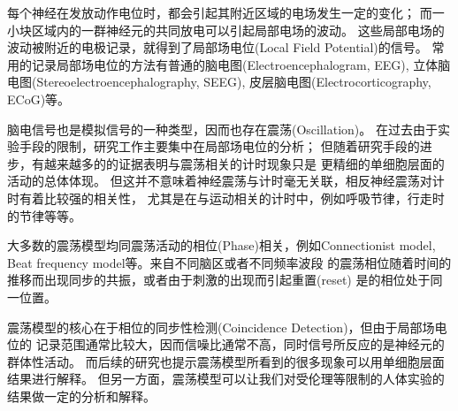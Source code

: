 每个神经在发放动作电位时，都会引起其附近区域的电场发生一定的变化；
而一小块区域内的一群神经元的共同放电可以引起局部电场的波动。
这些局部电场的波动被附近的电极记录，就得到了局部场电位(Local Field Potential)的信号。
常用的记录局部场电位的方法有普通的脑电图(Electroencephalogram, EEG),
立体脑电图(Stereoelectroencephalography, SEEG), 皮层脑电图(Electrocorticography, ECoG)等。

脑电信号也是模拟信号的一种类型，因而也存在震荡(Oscillation)。
在过去由于实验手段的限制，研究工作主要集中在局部场电位的分析；
但随着研究手段的进步，有越来越多的的证据表明与震荡相关的计时现象只是
更精细的单细胞层面的活动的总体体现。
但这并不意味着神经震荡与计时毫无关联，相反神经震荡对计时有着比较强的相关性，
尤其是在与运动相关的计时中，例如呼吸节律，行走时的节律等等。

大多数的震荡模型均同震荡活动的相位(Phase)相关，例如Connectionist model,
Beat frequency model等。来自不同脑区或者不同频率波段
的震荡相位随着时间的推移而出现同步的共振，或者由于刺激的出现而引起重置(reset)
是的相位处于同一位置。

震荡模型的核心在于相位的同步性检测(Coincidence Detection)，但由于局部场电位的
记录范围通常比较大，因而信噪比通常不高，同时信号所反应的是神经元的群体性活动。
而后续的研究也提示震荡模型所看到的很多现象可以用单细胞层面结果进行解释。
但另一方面，震荡模型可以让我们对受伦理等限制的人体实验的结果做一定的分析和解释。
